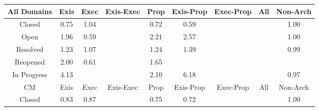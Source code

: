 \begin{tabular}{|c||c|c|c|c|c|c|c|c|}
\hline
All Domains & Exis & Exec & Exis-Exec & Prop & Exis-Prop & Exec-Prop & All & Non-Arch \\ 
\hline
Closed & \cellcolor[rgb]{0.8636453540788538,0.6205880093065748,0.37673566380693024} 0.75 & \cellcolor[rgb]{0.909811789510253,0.8399108476627514,0.42} 1.04 &  & \cellcolor[rgb]{0.8583771748500739,0.5956519609570163,0.3718186965267356} 0.72 & \cellcolor[rgb]{0.8340605781905494,0.48055340343526703,0.34912320631117943} 0.59 &  &  & \cellcolor[rgb]{0.9099928262833618,0.8399966019236976,0.42} 1.00 \\ 
\hline
Open & \cellcolor[rgb]{0.905197399297777,0.8377250838778943,0.42} 1.96 & \cellcolor[rgb]{0.8356768476877107,0.48820374572183023,0.3506317245085299} 0.59 &  & \cellcolor[rgb]{0.9039635242759234,0.8371406167622795,0.42} 2.21 & \cellcolor[rgb]{0.9021395313695081,0.8362766201223986,0.42} 2.57 &  &  & \cellcolor[rgb]{0.9099753504091651,0.8399883238780256,0.42} 1.00 \\ 
\hline
Resolved & \cellcolor[rgb]{0.9088398991148885,0.8394504785281051,0.42} 1.23 & \cellcolor[rgb]{0.9096662151681769,0.8398418913954522,0.42} 1.07 &  & \cellcolor[rgb]{0.9087945509846871,0.8394289978348516,0.42} 1.24 & \cellcolor[rgb]{0.9080611541912447,0.8390815993537475,0.42} 1.39 &  &  & \cellcolor[rgb]{0.9089938814945978,0.8352377057410966,0.4190609560616247} 0.99 \\ 
\hline
Reopened & \cellcolor[rgb]{0.905003425743388,0.8376332016679205,0.42} 2.00 & \cellcolor[rgb]{0.8393731337840871,0.5056994999113453,0.3540815915318146} 0.61 &  & \cellcolor[rgb]{0.9067759094723137,0.8384727992237275,0.42} 1.65 &  &  &  &  \\ 
\hline
In Progress & \cellcolor[rgb]{0.8943378006140827,0.8325810634487761,0.42} 4.13 &  &  & \cellcolor[rgb]{0.9045025272006912,0.8373959339371695,0.42} 2.10 & \cellcolor[rgb]{0.8840954083817205,0.8277294039702886,0.42} 6.18 &  &  & \cellcolor[rgb]{0.9045809942774615,0.8143500395799843,0.4149422613256307} 0.97 \\ 
\hline
\hline
CM & Exis & Exec & Exis-Exec & Prop & Exis-Prop & Exec-Prop & All & Non-Arch \\ 
\hline
Closed & \cellcolor[rgb]{0.87850144055506,0.6909068186272838,0.39060134451805595} 0.83 & \cellcolor[rgb]{0.8854610191177363,0.7238488238239517,0.39709695117655386} 0.87 &  & \cellcolor[rgb]{0.8645435197984614,0.6248393270460502,0.37757395181189723} 0.75 & \cellcolor[rgb]{0.8592543834168299,0.5998040815063281,0.3726374245223746} 0.72 &  &  & \cellcolor[rgb]{0.909980393953512,0.8399907129253478,0.42} 1.00 \\ 

\end{tabular}
